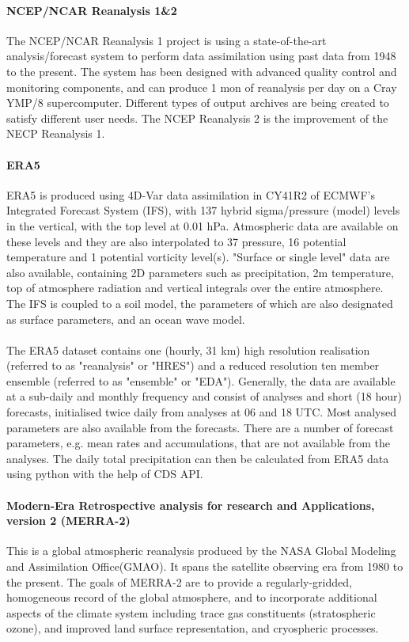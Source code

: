 \paragraph{NCEP/NCAR Reanalysis 1\&2}
The NCEP/NCAR Reanalysis 1 project is using a state-of-the-art analysis/forecast system to perform data assimilation using past data from 1948 to the present. The system has been designed with advanced quality control and monitoring components, and can produce 1 mon of reanalysis per day on a Cray YMP/8 supercomputer. Different types of output archives are being created to satisfy different user needs\cite{kalnay1996ncep}. The NCEP Reanalysis 2 is the improvement of the NECP Reanalysis 1.
\paragraph{ERA5}
ERA5 is produced using 4D-Var data assimilation in CY41R2 of ECMWF's Integrated Forecast System (IFS), with 137 hybrid sigma/pressure (model) levels in the vertical, with the top level at 0.01 hPa. Atmospheric data are available on these levels and they are also interpolated to 37 pressure, 16 potential temperature and 1 potential vorticity level(s). \cite{hersbach2020era5}"Surface or single level" data are also available, containing 2D parameters such as precipitation, 2m temperature, top of atmosphere radiation and vertical integrals over the entire atmosphere. The IFS is coupled to a soil model, the parameters of which are also designated as surface parameters, and an ocean wave model.\\\\
The ERA5 dataset contains one (hourly, 31 km) high resolution realisation (referred to as "reanalysis" or "HRES") and a reduced resolution ten member ensemble (referred to as "ensemble" or "EDA"). Generally, the data are available at a sub-daily and monthly frequency and consist of analyses and short (18 hour) forecasts, initialised twice daily from analyses at 06 and 18 UTC.\cite{hersbach2020era5} Most analysed parameters are also available from the forecasts. There are a number of forecast parameters, e.g. mean rates and accumulations, that are not available from the analyses.
The daily total precipitation can then be calculated from ERA5 data using python with the help of CDS API.
\paragraph{Modern-Era Retrospective analysis for research and Applications, version 2 (MERRA-2)}
This is a global atmospheric reanalysis produced by the NASA Global Modeling and Assimilation Office(GMAO). It spans the satellite observing era from 1980 to the present. The goals of MERRA-2 are to provide a regularly-gridded, homogeneous record of the global atmosphere, and to incorporate additional aspects of the climate system including trace gas constituents (stratospheric ozone), and improved land surface representation, and cryospheric processes.
